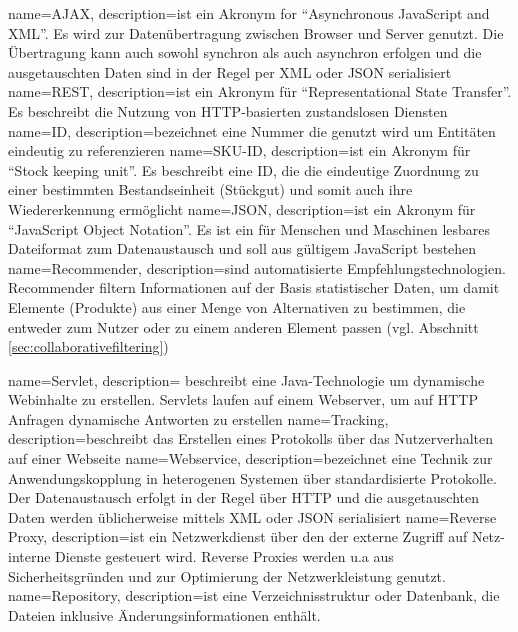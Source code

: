 
{
  name=AJAX,
  description={ist ein Akronym for ``Asynchronous JavaScript and XML''. Es wird zur Datenübertragung zwischen Browser und Server genutzt. Die Übertragung kann auch sowohl synchron als auch asynchron erfolgen und die ausgetauschten Daten sind in der Regel per XML oder JSON serialisiert}
}
{
  name=REST,
  description={ist ein Akronym für ``Representational State Transfer''. Es beschreibt die Nutzung von HTTP-basierten zustandslosen Diensten}
}
{
  name=ID,
  description={bezeichnet eine Nummer die genutzt wird um Entitäten eindeutig zu referenzieren}
}
{
  name=SKU-ID,
  description={ist ein Akronym für ``Stock keeping unit''. Es beschreibt eine ID, die die eindeutige Zuordnung zu einer bestimmten Bestandseinheit (Stückgut) und somit auch ihre Wiedererkennung ermöglicht}
}
{
  name=JSON,
  description={ist ein Akronym für ``JavaScript Object Notation''. Es ist ein für Menschen und Maschinen lesbares Dateiformat zum Datenaustausch und soll aus gültigem JavaScript bestehen}
}
{
  name=Recommender,
  description={sind automatisierte Empfehlungstechnologien. Recommender filtern Informationen auf der Basis statistischer Daten, um damit Elemente (Produkte) aus einer Menge von Alternativen zu bestimmen, die entweder zum Nutzer oder zu einem anderen Element passen (vgl. Abschnitt \ref{sec:collaborativefiltering})}
}

{
  name=Servlet,
  description={ beschreibt eine Java-Technologie um dynamische Webinhalte zu erstellen. Servlets laufen auf einem Webserver, um auf HTTP Anfragen dynamische Antworten zu erstellen}
}
{
  name=Tracking,
  description={beschreibt das Erstellen eines Protokolls über das Nutzerverhalten auf einer Webseite}
}
{
  name=Webservice,
  description={bezeichnet eine Technik zur Anwendungskopplung in heterogenen Systemen über standardisierte Protokolle. Der Datenaustausch erfolgt in der Regel über HTTP und die ausgetauschten Daten werden üblicherweise mittels XML oder JSON serialisiert}
}
{
  name=Reverse Proxy,
  description={ist ein Netzwerkdienst über den der externe Zugriff auf Netz-interne Dienste gesteuert wird. Reverse Proxies werden u.a aus Sicherheitsgründen und zur Optimierung der Netzwerkleistung genutzt.}
 }
{
  name=Repository,
  description={ist eine Verzeichnisstruktur oder Datenbank, die Dateien inklusive Änderungsinformationen enthält.}
 } 
 
 
